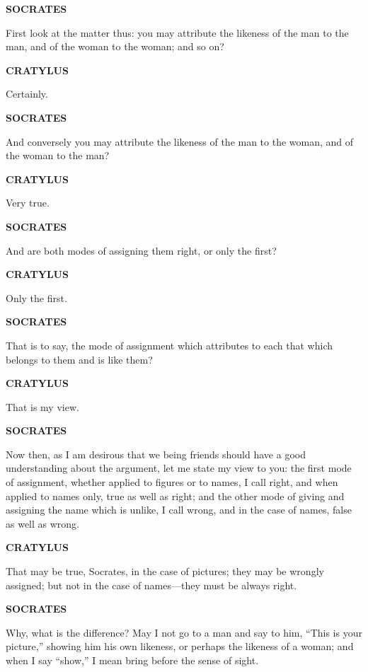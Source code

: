 \documentclass[11pt,letter]{article}
\begin{document}
\par \textbf{SOCRATES}
\par   First look at the matter thus:  you may attribute the likeness of the man to the man, and of the woman to the woman; and so on?

\par \textbf{CRATYLUS}
\par   Certainly.

\par \textbf{SOCRATES}
\par   And conversely you may attribute the likeness of the man to the woman, and of the woman to the man?

\par \textbf{CRATYLUS}
\par   Very true.

\par \textbf{SOCRATES}
\par   And are both modes of assigning them right, or only the first?

\par \textbf{CRATYLUS}
\par   Only the first.

\par \textbf{SOCRATES}
\par   That is to say, the mode of assignment which attributes to each that which belongs to them and is like them?

\par \textbf{CRATYLUS}
\par   That is my view.

\par \textbf{SOCRATES}
\par   Now then, as I am desirous that we being friends should have a good understanding about the argument, let me state my view to you:  the first mode of assignment, whether applied to figures or to names, I call right, and when applied to names only, true as well as right; and the other mode of giving and assigning the name which is unlike, I call wrong, and in the case of names, false as well as wrong.

\par \textbf{CRATYLUS}
\par   That may be true, Socrates, in the case of pictures; they may be wrongly assigned; but not in the case of names—they must be always right.

\par \textbf{SOCRATES}
\par   Why, what is the difference? May I not go to a man and say to him, “This is your picture,” showing him his own likeness, or perhaps the likeness of a woman; and when I say “show,” I mean bring before the sense of sight.
\end{document}
